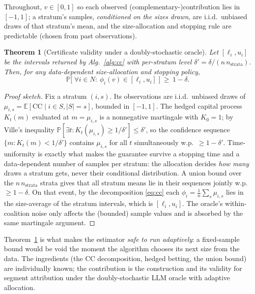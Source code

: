 \documentclass[10pt,twocolumn,letterpaper]{article}
\theoremstyle{plain}
\newtheorem{theorem}{Theorem}
\theoremstyle{definition}
\newcommand{\N}{N}
\newcommand{\shap}{\phi}
\newcommand{\cc}{\mathrm{CC}}
\newcommand{\E}{\mathbb{E}}
\newcommand{\Prob}{\mathbb{P}}
\begin{document}
Throughout, $v\in[0,1]$ so each observed (complementary-)contribution lies in
$[-1,1]$; a stratum's samples, \emph{conditioned on the sizes drawn}, are i.i.d.\
unbiased draws of that stratum's mean, and the size-allocation and stopping rule
are predictable (chosen from past observations).

\begin{theorem}[Certificate validity under a doubly-stochastic oracle]
\label{thm:cert}
Let $[\ell_i,u_i]$ be the intervals returned by Alg.~\ref{alg:cc} with
per-stratum level $\delta'=\delta/(n\,n_{\text{strata}})$. Then, for any
data-dependent size-allocation and stopping policy,
\[
\Prob\big[\;\forall i\in\N:\ \shap_i(v)\in[\ell_i,u_i]\;\big]\ \ge\ 1-\delta.
\]
\end{theorem}
\begin{proof}[Proof sketch]
Fix a stratum $(i,s)$. Its observations are i.i.d.\ unbiased draws of
$\mu_{i,s}=\E[\cc\mid i\in S,|S|=s]$, bounded in $[-1,1]$. The hedged capital
process $K_t(m)$ evaluated at $m=\mu_{i,s}$ is a nonnegative martingale with
$K_0=1$; by Ville's inequality $\Prob[\exists t:K_t(\mu_{i,s})\ge1/\delta']\le
\delta'$, so the confidence sequence $\{m:K_t(m)<1/\delta'\}$ contains
$\mu_{i,s}$ for all $t$ simultaneously w.p.\ $\ge1-\delta'$. Time-uniformity is
exactly what makes the guarantee survive a stopping time and a data-dependent
number of samples per stratum: the allocation decides \emph{how many} draws a
stratum gets, never their conditional distribution. A union bound over the
$n\,n_{\text{strata}}$ strata gives that all stratum means lie in their sequences
jointly w.p.\ $\ge1-\delta$. On that event, by the decomposition
\eqref{eq:cc} each $\shap_i=\frac1n\sum_s\mu_{i,s}$ lies in the size-average of
the stratum intervals, which is $[\ell_i,u_i]$. The oracle's within-coalition
noise only affects the (bounded) sample values and is absorbed by the same
martingale argument.
\end{proof}

Theorem~\ref{thm:cert} is what makes the estimator \emph{safe to run
adaptively}: a fixed-sample bound would be void the moment the algorithm chooses
its next size from the data. The ingredients (the CC decomposition, hedged
betting, the union bound) are individually known; the contribution is the
construction and its validity for segment attribution under the
doubly-stochastic LLM oracle with adaptive allocation.
\end{document}
